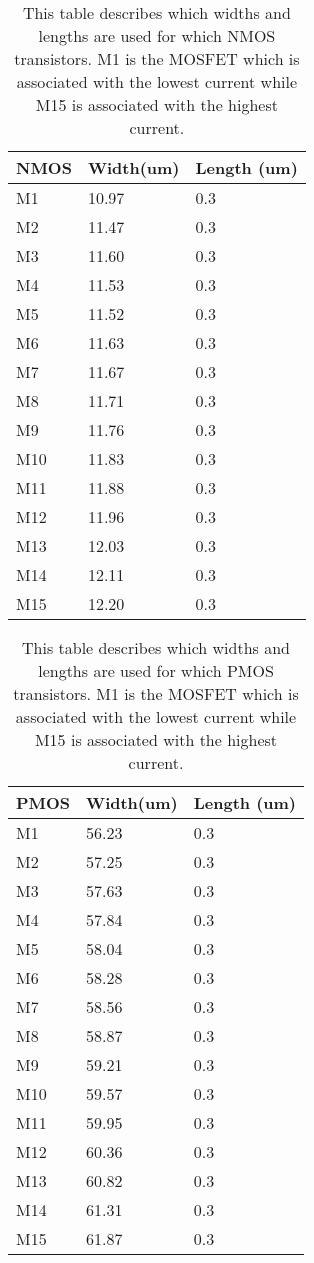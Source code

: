 \begin{appendices}
\begin{table}[h!]
\caption{This table describes which widths and lengths are used for which NMOS transistors. M1 is the MOSFET which is associated with the lowest current while M15 is associated with the highest current.}
\begin{tabular}{l||l|l}\arraybackslash
NMOS & Width(um) & Length (um) \\\hline\hline
M1 & 10.97 & 0.3\\\hline
M2 & 11.47 & 0.3\\\hline
M3 & 11.60 & 0.3\\\hline
M4 &  11.53 & 0.3\\\hline
M5 & 11.52 & 0.3\\\hline
M6 & 11.63 & 0.3\\\hline
M7 & 11.67 & 0.3\\\hline
M8 & 11.71 & 0.3\\\hline
M9 & 11.76 & 0.3\\\hline
M10 & 11.83 & 0.3\\\hline
M11 & 11.88 & 0.3\\\hline
M12 & 11.96 & 0.3\\\hline
M13 & 12.03 & 0.3\\\hline
M14 & 12.11 & 0.3\\\hline
M15 & 12.20 & 0.3
\end{tabular}
\label{Tab:NMOS}
\end{table}
\begin{table}
\caption{This table describes which widths and lengths are used for which PMOS transistors. M1 is the MOSFET which is associated with the lowest current while M15 is associated with the highest current.} 
\begin{tabular}{l||l|l}
PMOS & Width(um) & Length (um) \\\hline\hline
M1 & 56.23 & 0.3\\\hline
M2 & 57.25 & 0.3\\\hline
M3 & 57.63 & 0.3\\\hline
M4 & 57.84& 0.3\\\hline
M5 & 58.04 & 0.3\\\hline
M6 & 58.28 & 0.3\\\hline
M7 & 58.56 & 0.3\\\hline
M8 & 58.87 & 0.3\\\hline
M9 & 59.21 & 0.3\\\hline
M10 & 59.57 & 0.3\\\hline
M11 & 59.95 & 0.3\\\hline
M12 & 60.36 & 0.3\\\hline
M13 & 60.82 & 0.3\\\hline
M14 & 61.31 & 0.3\\\hline
M15 & 61.87 & 0.3
\end{tabular}
\label{Tab:PMOS}
\end{table}


\end{appendices}
